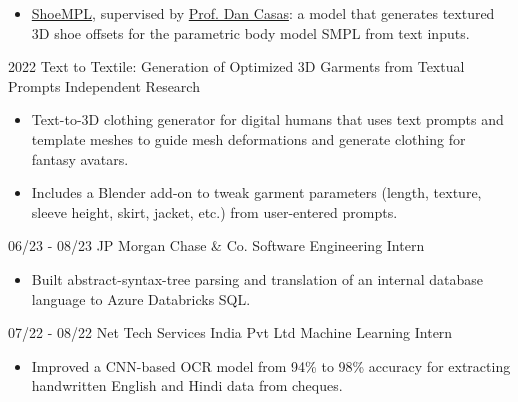 \documentclass[9pt]{developercv} %
\begin{document}
\begin{entrylist}
{        \begin{itemize}[noitemsep,topsep=0pt,parsep=0pt,partopsep=0pt, leftmargin=-1pt]
            \item \href{https://github.com/Prerana-Achar/ShoeMPL}{ShoeMPL}, supervised by \href{https://scholar.google.com/citations?user=fE2rjFcAAAAJ}{Prof. Dan Casas}: a model that generates textured 3D shoe offsets for the parametric body model SMPL from text inputs.
        \end{itemize}
        }
    \entry
        {2022}
        {Text to Textile: Generation of Optimized 3D Garments from Textual Prompts}
        {Independent Research}
        {\vspace{-10pt}
        \begin{itemize}[noitemsep,topsep=0pt,parsep=0pt,partopsep=0pt, leftmargin=-1pt]
            \item Text-to-3D clothing generator for digital humans that uses text prompts and template meshes to guide mesh deformations and generate clothing for fantasy avatars.
            \item Includes a Blender add-on to tweak garment parameters (length, texture, sleeve height, skirt, jacket, etc.) from user-entered prompts.
        \end{itemize}
        }
\end{entrylist}

\vspace{-10 pt}
\begin{entrylist}
    \entry
        {06/23 - 08/23}
        {JP Morgan Chase \& Co.}
        {Software Engineering Intern}
        {\vspace{-10pt}
        \begin{itemize}[noitemsep,topsep=0pt,parsep=0pt,partopsep=0pt, leftmargin=-1pt]
            \item Built abstract-syntax-tree parsing and translation of an internal database language to Azure Databricks SQL.
        \end{itemize}
        }
    \entry
        {07/22 - 08/22}
        {Net Tech Services India Pvt Ltd}
        {Machine Learning Intern}
        {\vspace{-10pt}
        \begin{itemize}[noitemsep,topsep=0pt,parsep=0pt,partopsep=0pt, leftmargin=-1pt]
            \item Improved a CNN-based OCR model from 94\% to 98\% accuracy for extracting handwritten English and Hindi data from cheques.
        \end{itemize}
        }
\end{entrylist}
\end{document}
